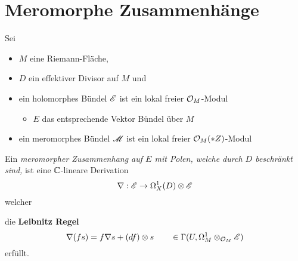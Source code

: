 \section{Meromorphe Zusammenhänge} %
Sei
\begin{itemize}
  \item $M$ eine Riemann-Fläche\marginnote{$\C$},
  \item $D$ ein effektiver Divisor auf $M$ und
  \item ein holomorphes Bündel $\mathscr{E}$ ist ein lokal freier $\mathcal{O}_M$-Modul
    \begin{itemize}
      \item $E$ das entsprechende Vektor Bündel über $M$
    \end{itemize}
  \item ein meromorphes Bündel $\mathscr{M}$ ist ein lokal freier $\mathcal{O}_M(*Z)$-Modul
\end{itemize}
\begin{defn}
  Ein \emph{meromorpher Zusammenhang auf $E$ mit Polen, welche durch $D$
  beschränkt sind,} ist eine $\C$-lineare Derivation
  \[
    \nabla:\mathscr{E}\to\Omega_X^1(D)\otimes\mathscr{E}
  \]
  welcher
  \begin{comment}
    \begin{itemize}
      \item für
        \begin{itemize}
          \item alle offenen Mengen $U\subset M$,
          \item alle Schnitte $s\in\Gamma(U,\sE)$ und
          \item alle holomorphen Funktionen $f\in\cO(U)$
        \end{itemize}
    \end{itemize}
  \end{comment}
  die \textbf{Leibnitz Regel}
  \[
    \nabla(fs)=f\nabla s+(df)\otimes s
    \qquad
    \in\Gamma(U,\Omega_M^1\otimes_{\mathcal{O}_M}\mathscr{E})
  \]
  erfüllt.


  \begin{comment}
    \begin{defn}
      Ein Zusammenhang heiß \emph{flach} oder \emph{integrabel} falls
      \begin{itemize}
        \item seine Krümmung $R_\nabla\equiv0$
          wobei
          \begin{itemize}
            \item $R_\nabla
              :=\nabla\circ\nabla:\sE\to\Omega_M^2\otimes_{\cO_M}\sE$
          \end{itemize}
      \end{itemize}
      \begin{rem}[ \cite{sabbah2007isomonodromic} Rem 0.12.5]
        Falls $\dim(M)=1$ ist jeder Zusammenhang flach.
      \end{rem}
    \end{defn}
  \end{comment}
\end{defn}
